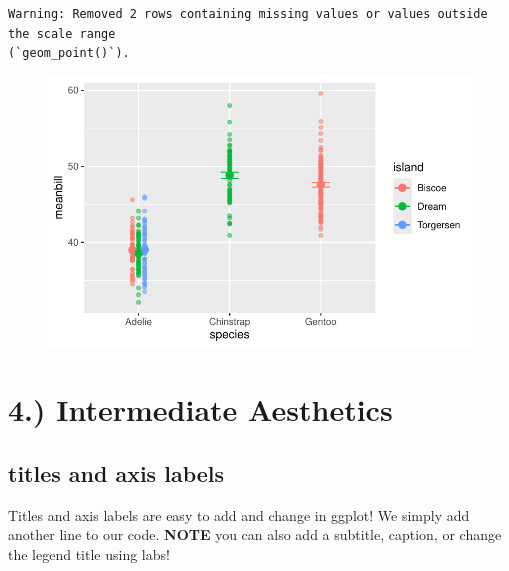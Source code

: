 \documentclass[
  letterpaper,
  DIV=11,
  numbers=noendperiod]{scrartcl}
\begin{document}
\begin{verbatim}
Warning: Removed 2 rows containing missing values or values outside the scale range
(`geom_point()`).
\end{verbatim}

\begin{figure}[H]

{\centering \includegraphics{Lab_2_files/figure-pdf/unnamed-chunk-21-1.pdf}

}

\end{figure}

\hypertarget{intermediate-aesthetics}{%
\section{\texorpdfstring{\textbf{4.) Intermediate
Aesthetics}}{4.) Intermediate Aesthetics}}\label{intermediate-aesthetics}}

\subsection{\texorpdfstring{\textbf{titles and axis
labels}}{titles and axis labels}}

Titles and axis labels are easy to add and change in ggplot! We simply
add another line to our code. \textbf{NOTE} you can also add a subtitle,
caption, or change the legend title using labs!
\end{document}
